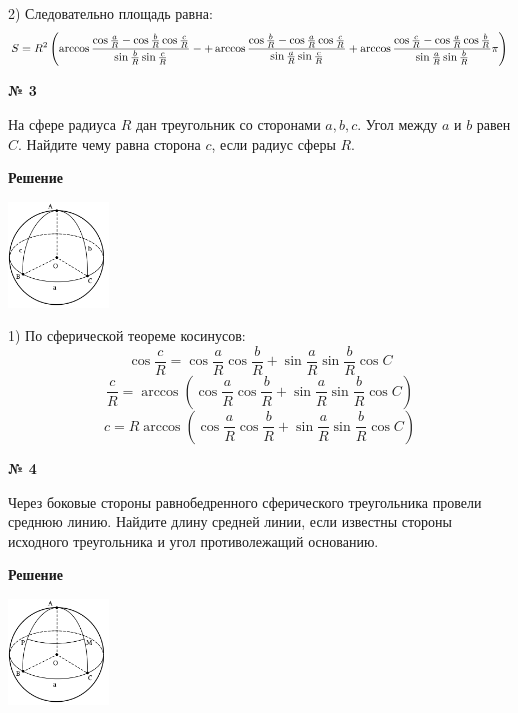     2) Следовательно площадь равна:
    \[
        S = R^2\left(\arccos \frac{\cos \frac{a}{R} - \cos \frac{b}{R}\cos\frac{c}{R}}{\sin \frac{b}{R}\sin\frac{c}{R}} -
        + \arccos  \frac{\cos \frac{b}{R} - \cos \frac{a}{R}\cos\frac{c}{R}}{\sin \frac{a}{R}\sin\frac{c}{R}}
        + \arccos \frac{\cos \frac{c}{R} - \cos \frac{a}{R}\cos\frac{b}{R}}{\sin \frac{a}{R}\sin\frac{b}{R}}\\
        \pi\right)
    \]

    \begin{center}
        \textbf{№ 3}
    \end{center}

    На сфере радиуса $R$ дан треугольник со сторонами $a, b, c$.
    Угол между $a$ и $b$ равен $C$.
    Найдите чему равна сторона $c$, если радиус сферы $R$.

    \textbf{Решение}\\

    \begin{center}
        \includegraphics[width=0.2\textwidth]{images/img4}\\
    \end{center}

    1) По сферической теореме косинусов:
    \[
        \cos \frac{c}{R} = \cos\frac{a}{R}\cos\frac{b}{R} + \sin\frac{a}{R}\sin\frac{b}{R}\cos C
    \]
    \[
        \frac{c}{R} = \arccos\left( \cos\frac{a}{R}\cos\frac{b}{R} + \sin\frac{a}{R}\sin\frac{b}{R}\cos C\right)
    \]
    \[
        c = R\arccos\left( \cos\frac{a}{R}\cos\frac{b}{R} + \sin\frac{a}{R}\sin\frac{b}{R}\cos C\right)
    \]

    \begin{center}
        \textbf{№ 4}
    \end{center}

    Через боковые стороны равнобедренного сферического треугольника провели среднюю линию.
    Найдите длину средней линии, если известны стороны исходного треугольника и угол противолежащий основанию.

    \textbf{Решение}\\

    \begin{center}
        \includegraphics[width=0.2\textwidth]{images/img5}\\
    \end{center}


